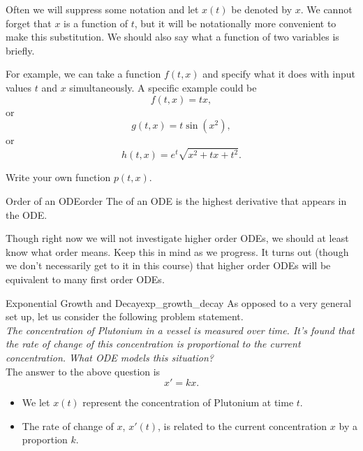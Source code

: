         \noindent Often we will suppress some notation and let $x(t)$ be denoted by $x$.  We cannot forget that $x$ is a function of $t$, but it will be notationally more convenient to make this substitution. We should also say what a function of two variables is briefly.
        
        For example, we can take a function $f(t,x)$ and specify what it does with input values $t$ and $x$ simultaneously. A specific example could be
        \[
        f(t,x)=tx,
        \]
        or
        \[
        g(t,x)= t\sin\left(x^2\right),
        \]
        or
        \[
        h(t,x)= e^{t}\sqrt{x^2+tx+t^2}.
        \]
        
        \begin{exercise}
        Write your own function $p(t,x)$.
        \end{exercise}
        
        \begin{df}{Order of an ODE}{order}
        The   of an ODE is the highest derivative that appears in the ODE.
        \end{df}
        
        \noindent Though right now we will not investigate higher order ODEs, we should at least know what order means.  Keep this in mind as we progress.  It turns out (though we don't necessarily get to it in this course) that higher order ODEs will be equivalent to many first order ODEs.  
        
        \begin{ex}{Exponential Growth and Decay}{exp_growth_decay}
        As opposed to a very general set up, let us consider the following problem statement.\\
        
        \emph{The concentration of Plutonium in a vessel is measured over time.  It's found that the rate of change of this concentration is proportional to the current concentration.  What ODE models this situation?}\\
        
        The answer to the above question is
        \[
        x'=kx.
        \]
        \begin{itemize}
            \item We let $x(t)$ represent the concentration of Plutonium at time $t$.
            \item The rate of change of $x$, $x'(t)$, is related to the current concentration $x$ by a proportion $k$.
        \end{itemize}
        \end{ex}
        
